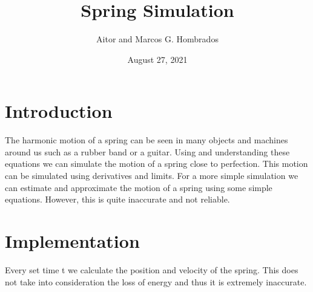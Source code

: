 \documentclass{article}
\begin{document}
\begin{titlepage}
	\title{Spring Simulation}
	\author{Aitor and Marcos G. Hombrados}
	\date{August 27, 2021}
	\maketitle
\end{titlepage}
\section{Introduction}\label{sec:intro}
The harmonic motion of a spring can be seen in many objects and machines around us such as a rubber band or a guitar. Using and understanding these equations we can simulate the motion of a spring close to perfection. This motion can be simulated using derivatives and limits. For a more simple simulation we can estimate and approximate the motion of a spring using some simple equations. However, this is quite inaccurate and not reliable.

\section{Implementation}\label{sec:intro}
Every set time t we calculate the position and velocity of the spring. This does not take into consideration the loss of energy and thus it is extremely inaccurate.
\end{document}
